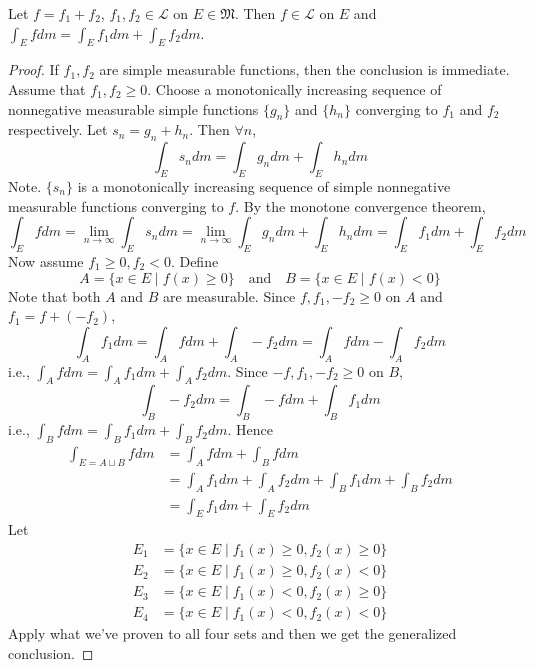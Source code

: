 \documentclass[11pt]{article}
\begin{document}
  \begin{theorem} Let $f = f_1 + f_2$, $f_1, f_2 \in \mathscr{L}$ on $E \in \mathfrak{M}$. Then $f \in \mathscr{L}$ on $E$ and $\int_E f dm = \int_E f_1 dm + \int_E f_2 dm$.
  \end{theorem}
  \begin{proof} If $f_1, f_2$ are simple measurable functions, then the conclusion is immediate. Assume that $f_1, f_2 \ge 0$. Choose a monotonically increasing sequence of nonnegative measurable simple functions $\{ g_n \}$ and $\{ h_n \}$ converging to $f_1$ and $f_2$ respectively. Let $s_n = g_n + h_n$. Then $\forall n$, $$\int_E s_n dm = \int_E g_n dm + \int_E h_n dm$$Note. $\{ s_n \}$ is a monotonically increasing sequence of simple nonnegative measurable functions converging to $f$. By the monotone convergence theorem, $$\int_E f dm = \lim_{n \to \infty} \int_E s_n dm = \lim_{n \to \infty} \int_E g_n dm + \int_E h_n dm = \int_E f_1 dm + \int_E f_2 dm$$ Now assume $f_1 \ge 0, f_2 < 0$. Define $$A = \{ x \in E \mid f(x) \ge 0 \} \quad \text{and} \quad B = \{ x \in E \mid f(x) < 0 \}$$ Note that both $A$ and $B$ are measurable. Since $f, f_1, -f_2 \ge 0$ on $A$ and $f_1 = f + (-f_2)$, $$\int_A f_1 dm = \int_A f dm + \int_A - f_2 dm = \int_A f dm - \int_A f_2 dm$$i.e., $\int_A f dm = \int_A f_1 dm + \int_A f_2 dm$.
Since $-f, f_1, -f_2 \ge 0$ on $B$, $$\int_B -f_2 dm = \int_B -f dm + \int_B f_1 dm$$ i.e., $\int_B f dm = \int_B f_1 dm + \int_B f_2 dm$. 
Hence \begin{align*} \int_{E = A \sqcup B}  f dm & = \int_A f dm + \int_B f dm \\ & = \int_A f_1 dm + \int_A f_2 dm + \int_B f_1 dm + \int_B f_2 dm \\ & = \int_E f_1 dm + \int_E f_2 dm  \end{align*} Let \begin{align*} E_1 & = \{ x \in E \mid f_1(x) \ge 0, f_2(x) \ge 0 \} \\ E_2 & = \{ x \in E \mid f_1(x) \ge 0, f_2(x) < 0 \} \\ E_3 & = \{ x \in E \mid f_1(x) < 0, f_2(x) \ge 0 \} \\ E_4 & = \{ x \in E \mid f_1(x) < 0, f_2(x) < 0 \} \end{align*} Apply what we've proven to all four sets and then we get the generalized conclusion.
\end{proof}
\end{document}
